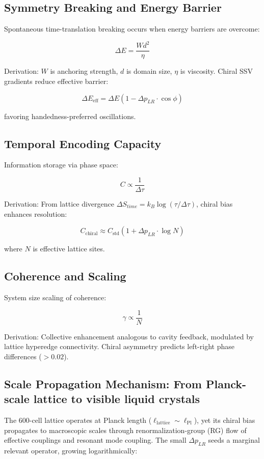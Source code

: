 \documentclass[11pt]{article}
\begin{document}
\subsection{Symmetry Breaking and Energy Barrier}
Spontaneous time-translation breaking occurs when energy barriers are overcome:

\[
\Delta E = \frac{W d^2}{\eta}
\]

Derivation: $W$ is anchoring strength, $d$ is domain size, $\eta$ is viscosity. Chiral SSV gradients reduce effective barrier:

\[
\Delta E_{\text{eff}} = \Delta E (1 - \Delta p_{LR} \cdot \cos\phi)
\]

favoring handedness-preferred oscillations.

\subsection{Temporal Encoding Capacity}
Information storage via phase space:

\[
C \propto \frac{1}{\Delta \tau}
\]

Derivation: From lattice divergence $\Delta S_{time} = k_B \log(\tau / \Delta \tau)$, chiral bias enhances resolution:

\[
C_{\text{chiral}} \approx C_{\text{std}} (1 + \Delta p_{LR} \cdot \log N)
\]

where $N$ is effective lattice sites.

\subsection{Coherence and Scaling}
System size scaling of coherence:

\[
\gamma \propto \frac{1}{N}
\]

Derivation: Collective enhancement analogous to cavity feedback, modulated by lattice hyperedge connectivity. Chiral asymmetry predicts left-right phase differences ($> 0.02$).

\subsection{Scale Propagation Mechanism: From Planck-scale lattice to visible liquid crystals}
The 600-cell lattice operates at Planck length ($\ell_{\text{lattice}} \sim \ell_{\text{Pl}}$), yet its chiral bias propagates to macroscopic scales through renormalization-group (RG) flow of effective couplings and resonant mode coupling. The small $\Delta p_{LR}$ seeds a marginal relevant operator, growing logarithmically:
\end{document}
